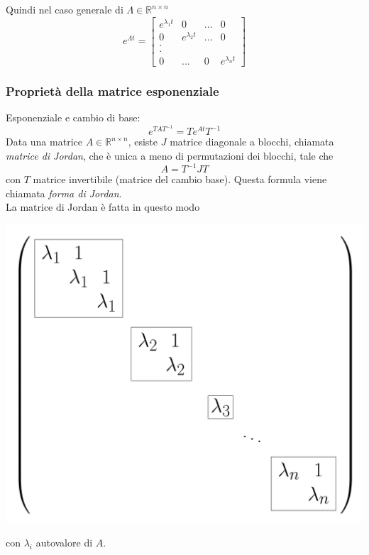 \documentclass{article}
\begin{document}
Quindi nel caso generale di $\Lambda \in \mathbb{R}^{n \times n}$
\[
    e^{\Lambda t} = 
    \begin{bmatrix}
        e^{\lambda_1 t} & 0 & ... & 0\\
        0 & e^{\lambda_2 t} & ... & 0\\
        .\\
        .\\
        0 & ... & 0 & e^{\lambda_n t}
    \end{bmatrix}
\]


\subsubsection{Proprietà della matrice esponenziale} \label{proprietà della matrice esponenziale}
Esponenziale e cambio di base:
\[
    e^{TAT^{-1}} = Te^{At}T^{-1}
\]
Data una matrice $A \in \mathbb{R}^{n \times n}$, esiste $J$ matrice diagonale a blocchi, chiamata \textit{matrice di Jordan}, che è unica a meno di permutazioni dei blocchi, tale che
\[
    A = T^{-1} J T
\]
con $T$ matrice invertibile (matrice del cambio base). Questa formula viene chiamata \textit{forma di Jordan}.
\vspace*{0.2cm}\\
La matrice di Jordan è fatta in questo modo
\begin{center}
    \includegraphics[scale=0.13]{Images/Jordan_matrix.png}
\end{center}
con $\lambda_i$ autovalore di $A$.
\vspace*{0.2cm}\\
\end{document}
